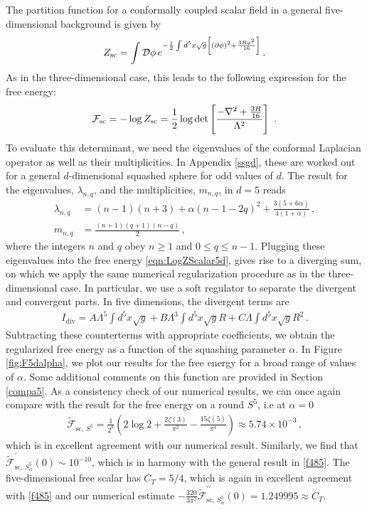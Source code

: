 \documentclass[12pt]{article}
\numberwithin{equation}{section}
\newcommand{\ssc}{\scriptscriptstyle}
\newcommand{\ctt}{C_{\ssc T}}
\begin{document}
The partition function for a conformally coupled scalar field in a general five-dimensional background is given by
%
\begin{align}
Z_{\rm sc}=\int \mathcal{D} \phi\, e^{-\frac{1}{2}\int d^5x \sqrt{g} \left[ (\partial \phi)^2 +\frac{3 R\phi^2}{16} \right]} \, .
\end{align}
%
As in the three-dimensional case, this leads to the following expression for the free energy:
%
\begin{align}
 \mathcal{F}_{\rm sc}=- \log Z_{\rm sc}=\frac{1}{2}\log \textrm{det}\left[ \frac{-\nabla^2 +\frac{3R}{16}}{ \Lambda^2}\right]\ . \label{eqn:LogZScalar5d}
\end{align}
%
To evaluate this determinant, we need the eigenvalues of the conformal Laplacian operator as well as their multiplicities. In Appendix \ref{ssgd}, these are worked out for a general $d$-dimensional squashed sphere for odd values of $d$. The result for the eigenvalues, $\lambda_{n,q}$, and the multiplicities, $m_{n,q}$, in $d=5$ reads
%
\begin{align}
\lambda_{n,q}&=(n-1)(n+3)+\alpha(n-1-2q)^2+\frac{3(5+6\alpha)}{4(1+\alpha)}\, ,\label{eigensq5d}\\
m_{n,q}&=\frac{\left(n+1\right)(q+1)(n-q)}{2}\, ,\label{degesq5d}
\end{align}
%
where the integers $n$ and $q$ obey $n\geq1$ and $0\leq q\leq n-1$. Plugging these eigenvalues into the free energy \eqref{eqn:LogZScalar5d}, gives rise to a diverging sum, on which we apply the same numerical regularization procedure as in the three-dimensional case. In particular, we use a soft regulator to separate the divergent and convergent parts. In five dimensions, the divergent terms are
%
\begin{align}
I_{\textrm{div}}= A \Lambda^5\int d^5 x \sqrt{g} + B \Lambda^3\int d^5 x \sqrt{g} R + C \Lambda \int d^5 x \sqrt{g} R^2 \, . \label{eqn:divergences2}
\end{align}
%
Subtracting these counterterms with appropriate coefficients, we obtain the regularized free energy as a function of the squashing parameter $\alpha$. In Figure \ref{fig:F5dalpha}, we plot our results for the free energy for a broad range of values of $\alpha$. Some additional comments on this function are provided in Section \ref{compa5}. As a consistency check of our numerical results, we can once again compare with the result for the free energy on a round $S^5$, i.e at $\alpha=0$ \cite{Klebanov:2011gs}
%
\begin{align}
  \tilde{\mathcal{F}}_{\textrm{sc},\, S^5} = \frac{1}{2^8} \left( 2 \log 2 +\frac{2 \zeta(3)}{\pi^2}- \frac{15\zeta(5)}{\pi^4}\right) \approx 5.74 \times 10^{-3} \, ,
\end{align}
%
which is in excellent agreement with our numerical result. Similarly, we find that $ \tilde{\mathcal{F}}^{\prime}_{\textrm{sc},\, S^5_\alpha}(0)\sim 10^{-10}$, which is in harmony with the general result in \eqref{f485}. The five-dimensional free scalar has $\ctt=5/4$, which is again in excellent agreement with \eqref{f485} and our numerical estimate $ -\frac{320}{3\pi^2} \tilde{\mathcal{F}}^{\prime\prime}_{\textrm{sc},\, S^5_\alpha}(0) = 1.249995 \approx \ctt $.
\end{document}
